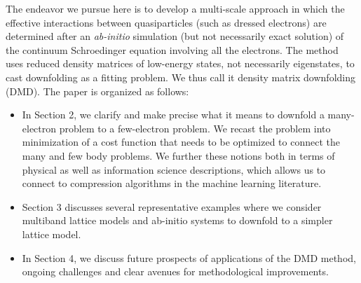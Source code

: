 The endeavor we pursue here is to develop a multi-scale approach in which the effective interactions between quasiparticles (such as dressed electrons) are determined after an \textit{ab-initio} simulation (but not necessarily exact solution) of the continuum Schroedinger equation involving all the electrons. The method uses reduced density matrices of low-energy states, not necessarily eigenstates, 
to cast downfolding as a fitting problem. We thus call it density matrix downfolding (DMD).
The  paper is organized as follows:
\begin{itemize} 
\item 	In Section 2, we clarify and make precise what it means to downfold 
a many-electron problem to a few-electron problem. We recast the problem into minimization 
of a cost function that needs to be optimized to connect the many and few body problems. We further 
these notions both in terms of physical as well as information science descriptions, which allows us to connect to compression algorithms in the machine learning literature. 
\item Section 3 discusses several representative examples where we consider multiband lattice models 
and ab-initio systems to downfold to a simpler lattice model. 
\item In Section 4, we discuss future prospects of applications of the DMD method, ongoing challenges 
and clear avenues for methodological improvements. 
\end{itemize}


